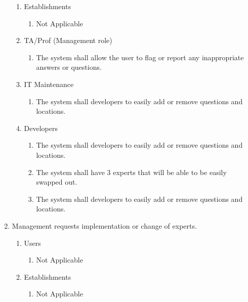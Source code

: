 \documentclass[titlepage]{article}
\newcounter{req}
\begin{document}
\begin{enumerate}[{BE1}]
\begin{enumerate}[{VP3.1}]
				\item Establishments
				\begin{enumerate}
					\item Not Applicable
				\end{enumerate}
				
				\item TA/Prof (Management role)
				\begin{enumerate}
					\item The system shall allow the user to flag or report any inappropriate answers or questions.
				\end{enumerate}
				
				\item IT Maintenance
				\begin{enumerate}
					\item  The system shall developers to easily add or remove questions and locations.
				\end{enumerate}
				
				\item Developers
				\begin{enumerate}
					\item The system shall developers to easily add or remove questions and locations.
					\item The system shall have 3 experts that will be able to be easily swapped out.
					\item The system shall developers to easily add or remove questions and locations.
				\end{enumerate}
				
			\end{enumerate}
			
			\item Management requests implementation or change of experts.
			\begin{enumerate}[{VP4.1}]
				
				\item Users
				\begin{enumerate}
					\item Not Applicable
				\end{enumerate}
				
				\item Establishments
				\begin{enumerate}
					\item Not Applicable
				\end{enumerate}
				

\end{enumerate}
\end{enumerate}
\end{document}
